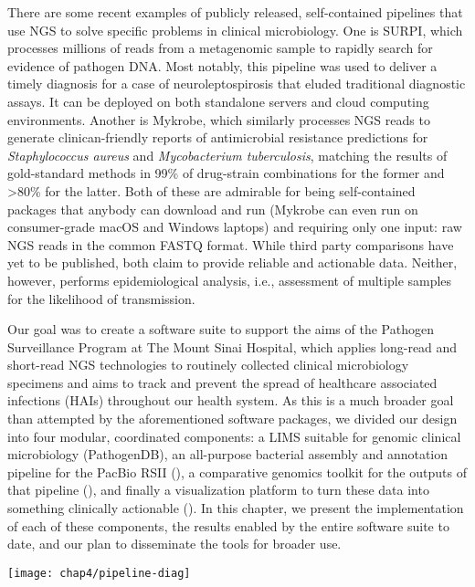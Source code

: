 There are some recent examples of publicly released, self-contained pipe\-lines that use NGS to solve specific problems in clinical microbiology. One is SURPI, which processes millions of reads from a metagenomic sample to rapidly search for evidence of pathogen DNA.\autocite{Naccache2014} Most notably, this pipeline was used to deliver a timely diagnosis for a case of neuroleptospirosis that eluded traditional diagnostic assays.\autocite{Wilson2014} It can be deployed on both standalone servers and cloud computing environments.\autocite{Naccache2014} Another is Mykrobe, which similarly processes NGS reads to generate clinican-friendly reports of antimicrobial resistance predictions for \emph{Staphylococcus aureus} and \emph{Mycobacterium tuberculosis}, matching the results of gold-standard methods in 99\% of drug-strain combinations for the former and >80\% for the latter.\autocite{Bradley2015} Both of these are admirable for being self-contained packages that anybody can download and run (Mykrobe can even run on consumer-grade macOS and Windows laptops) and requiring only one input: raw NGS reads in the common FASTQ format. While third party comparisons have yet to be published, both claim to provide reliable and actionable data. Neither, however, performs epidemiological analysis, i.e., assessment of multiple samples for the likelihood of transmission.

Our goal was to create a software suite to support the aims of the Pathogen Surveillance Program at The Mount Sinai Hospital, which applies long-read and short-read NGS technologies to routinely collected clinical microbiology specimens and aims to track and prevent the spread of healthcare associated infections (HAIs) throughout our health system. As this is a much broader goal than attempted by the aforementioned software packages, we divided our design into four modular, coordinated components: a LIMS suitable for genomic clinical microbiology (PathogenDB), an all-purpose bacterial assembly and annotation pipeline for the PacBio RSII (\pathogendbpipeline), a comparative genomics toolkit for the outputs of that pipeline (\pathogendbcomparison), and finally a visualization platform to turn these data into something clinically actionable (\pathogendbviz). In this chapter, we present the implementation of each of these components, the results enabled by the entire software suite to date, and our plan to disseminate the tools for broader use.

\begin{sidewaysfigure}[hp]
  \sidewaysvspace
  \centering
  \texttt{[image: chap4/pipeline-diag]}
\end{sidewaysfigure}

